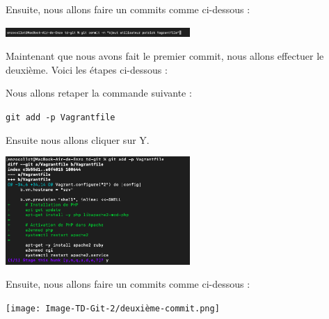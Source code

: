 \documentclass[12pt]{article}
\begin{document}
\vspace{0.3cm}

\newpage

Ensuite, nous allons faire un commits comme ci-dessous : 

\vspace{0.3cm}

\begin{center}
  \includegraphics[width=7cm]{Image-TD-Git-2/premier-git-commit.png}
\end{center}

\vspace{0.3cm}

Maintenant que nous avons fait le premier commit, nous allons effectuer le deuxième. Voici les étapes ci-dessous : 

\vspace{0.3cm}

Nous allons retaper la commande suivante : 

\texttt{git add -p Vagrantfile}

\vspace{0.3cm}

Ensuite nous allons cliquer sur Y. 

\vspace{0.3cm}


\begin{center}
  \includegraphics[width=7cm]{Image-TD-Git-2/git-add-2.png}
\end{center}

\vspace{0.3cm}

Ensuite, nous allons faire un commits comme ci-dessous : 

\vspace{0.3cm}

\begin{center}
  \texttt{[image: Image-TD-Git-2/deuxième-commit.png]}
\end{center}

\vspace{0.3cm}
\end{document}
